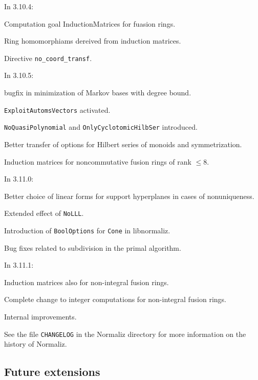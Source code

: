 In 3.10.4:

\begin{arab}
	\item Computation goal InductionMatrices for fuasion rings.
	\item Ring homomorphiams dereived from induction matrices.
	\item Directive \verb*|no_coord_transf|.
\end{arab}

In 3.10.5:

\begin{arab}
	\item  bugfix in minimization of Markov bases with degree bound.
	\item \verb*|ExploitAutomsVectors| activated.
	\item \verb*|NoQuasiPolynomial| and \verb*|OnlyCyclotomicHilbSer| introduced.
	\item Better transfer of options for Hilbert series of monoids and symmetrization.
	\item Induction matrices for noncommutative fusion rings of rank $\le 8$.
\end{arab}

In 3.11.0:

\begin{arab}
	\item Better choice of linear forms for support hyperplanes in cases of nonuniqueness.
	\item Extended effect of \verb*|NoLLL|.
	\item Introduction of \verb*|BoolOptions| for \verb*|Cone| in libnormaliz.
	\item Bug fixes related to subdivision in the primal algorithm. 
\end{arab}

In 3.11.1:

\begin{arab}
	\item Induction matrices also for non-integral fusion rings.
	\item  Complete change to integer computations for non-integral fusion rings.
	\item  Internal improvements.
\end{arab}
See the file \verb|CHANGELOG| in the Normaliz directory for more information on the history of Normaliz.


\subsection{Future extensions}

